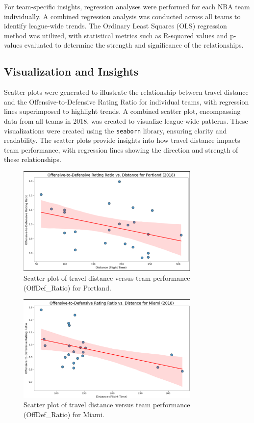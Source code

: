 \documentclass[12pt]{article}
\begin{document}
For team-specific insights, regression analyses were performed for each NBA team individually. A combined regression analysis was conducted across all teams to identify league-wide trends. The Ordinary Least Squares (OLS) regression method was utilized, with statistical metrics such as R-squared values and p-values evaluated to determine the strength and significance of the relationships.

\subsection{Visualization and Insights}
Scatter plots were generated to illustrate the relationship between travel distance and the Offensive-to-Defensive Rating Ratio for individual teams, with regression lines superimposed to highlight trends. A combined scatter plot, encompassing data from all teams in 2018, was created to visualize league-wide patterns. These visualizations were created using the \texttt{seaborn} library, ensuring clarity and readability. The scatter plots provide insights into how travel distance impacts team performance, with regression lines showing the direction and strength of these relationships.
\begin{figure}[h!]
    \centering
    \includegraphics[width=0.8\textwidth]{Screenshot 2024-12-18 131654.png}
    \caption{Scatter plot of travel distance versus team performance (OffDef\_Ratio) for Portland.}
    \label{fig:travel_performance_portland}
\end{figure}
\begin{figure}[h!]
    \centering
    \includegraphics[width=0.8\textwidth]{Screenshot 2024-12-18 142519.png}
    \caption{Scatter plot of travel distance versus team performance (OffDef\_Ratio) for Miami.}
    \label{fig:travel_performance_laclippers2}
\end{figure}
\end{document}
